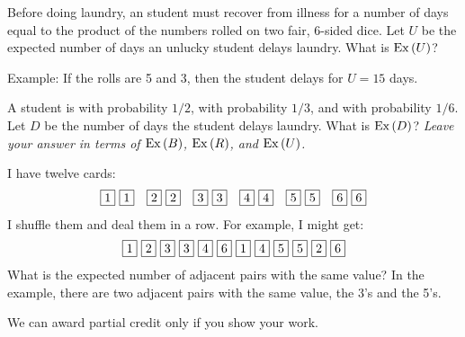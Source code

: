 \documentclass[12pt,oneside]{article}
\begin{document}
\begin{problem}[12 points]
\ppart Before doing laundry, an  student must recover
from illness for a number of days equal to the product of the numbers
rolled on two fair, 6-sided dice.  Let $U$ be the expected number of
days an unlucky student delays laundry.  What is $\operatorname{Ex}\left(U\right)$?

Example: If the rolls are 5 and 3, then the student delays for $U =
15$ days.


\ppart A student is  with probability $1/2$, 
with probability $1/3$, and  with probability $1/6$.
Let $D$ be the number of days the student delays laundry.  What is
$\operatorname{Ex}\left(D\right)$?  \textit{Leave your answer in terms of $\operatorname{Ex}\left(B\right)$, $\operatorname{Ex}\left(R\right)$,
and $\operatorname{Ex}\left(U\right)$.}

\solution{
\[
\ex{D} = \frac{1}{2} \ex{B} + \frac{1}{3} \ex{R} + \frac{1}{6} \ex{U}
\]
}

\eparts

\end{problem}


\newpage

\begin{problem}[12 points]
I have twelve cards:
%
\[
\fbox{1}\ \fbox{1}\quad \fbox{2}\ \fbox{2}\quad \fbox{3}\ \fbox{3}\quad
\fbox{4}\ \fbox{4}\quad \fbox{5}\ \fbox{5}\quad \fbox{6}\ \fbox{6}
\]
%
I shuffle them and deal them in a row.  For example, I might get:
%
\[
\fbox{1}\ \fbox{2}\ \fbox{3}\ \fbox{3}\ \fbox{4}\ \fbox{6}\ 
\fbox{1}\ \fbox{4}\ \fbox{5}\ \fbox{5}\ \fbox{2}\ \fbox{6}
\]
%
What is the expected number of adjacent pairs with the same value?  In
the example, there are two adjacent pairs with the same value, the 3's
and the 5's.

We can award partial credit only if you show your work.
\end{problem}

\end{document}
